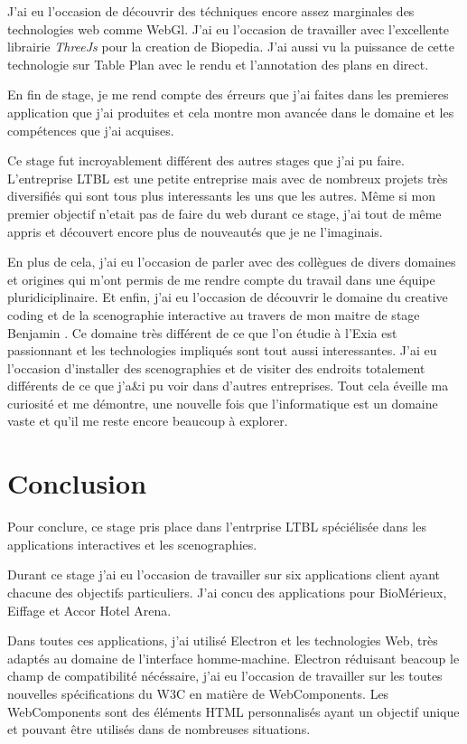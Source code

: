 \documentclass{article}
\begin{document}
    J'ai eu l'occasion de découvrir des téchniques encore assez marginales des technologies web comme WebGl.
    J'ai eu l'occasion de travailler avec l'excellente librairie \emph{ThreeJs} pour la creation de Biopedia.
    J'ai aussi vu la puissance de cette technologie sur Table Plan avec le rendu et l'annotation des plans en direct.

    En fin de stage, je me rend compte des érreurs que j'ai faites dans les premieres application que j'ai produites et cela montre mon avancée dans le domaine et les compétences que j'ai acquises.

    Ce stage fut incroyablement différent des autres stages que j'ai pu faire.
    L'entreprise LTBL est une petite entreprise mais avec de nombreux projets très diversifiés qui sont tous plus interessants les uns que les autres.
    Même si mon premier objectif n'etait pas de faire du web durant ce stage, j'ai tout de même appris et découvert encore plus de nouveautés que je ne l'imaginais.

    En plus de cela, j'ai eu l'occasion de parler avec des collègues de divers domaines et origines qui m'ont permis de me rendre compte du travail dans une équipe pluridiciplinaire.
    Et enfin, j'ai eu l'occasion de découvrir le domaine du creative coding et de la scenographie interactive au travers de mon maitre de stage Benjamin .
    Ce domaine très différent de ce que l'on étudie à l'Exia est passionnant et les technologies impliqués sont tout aussi interessantes.
    J'ai eu l'occasion d'installer des scenographies et de visiter des endroits totalement différents de ce que j'a&i pu voir dans d'autres entreprises.
    Tout cela éveille ma curiosité et me démontre, une nouvelle fois que l'informatique est un domaine vaste et qu'il me reste encore beaucoup à explorer.

    \clearpage

    \section{Conclusion}

    Pour conclure, ce stage pris place dans l'entrprise LTBL spéciélisée dans les applications interactives et les scenographies.

    Durant ce stage j'ai eu l'occasion de travailler sur six applications client ayant chacune des objectifs particuliers.
    J'ai concu des applications pour BioMérieux, Eiffage et Accor Hotel Arena.

    Dans toutes ces applications, j'ai utilisé Electron et les technologies Web, très adaptés au domaine de l'interface homme-machine.
    Electron réduisant beacoup le champ de compatibilité nécéssaire, j'ai eu l'occasion de travailler sur les toutes nouvelles spécifications du W3C en matière de WebComponents.
    Les WebComponents sont des éléments HTML personnalisés ayant un objectif unique et pouvant être utilisés dans de nombreuses situations.
\end{document}
